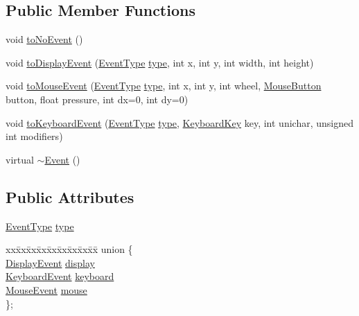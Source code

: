 \subsection*{Public Member Functions}
\begin{DoxyCompactItemize}
\item 
void \hyperlink{classZeta_1_1Event_acda69faf8654653da900fcb8a6d206c8}{to\+No\+Event} ()
\item 
void \hyperlink{classZeta_1_1Event_a956388e8c0923b21f20d8bb5197a16ca}{to\+Display\+Event} (\hyperlink{namespaceZeta_a2417d0aa7e77bdc1e5a79bbb909680ec}{Event\+Type} \hyperlink{classZeta_1_1Event_a6a2e98809068443e94dcf60f45cd45be}{type}, int x, int y, int width, int height)
\item 
void \hyperlink{classZeta_1_1Event_ac22bcd99528bd8995eb4dea400f81a51}{to\+Mouse\+Event} (\hyperlink{namespaceZeta_a2417d0aa7e77bdc1e5a79bbb909680ec}{Event\+Type} \hyperlink{classZeta_1_1Event_a6a2e98809068443e94dcf60f45cd45be}{type}, int x, int y, int wheel, \hyperlink{namespaceZeta_ad0d73128c6ba1daad12e3e286d63c7d3}{Mouse\+Button} button, float pressure, int dx=0, int dy=0)
\item 
void \hyperlink{classZeta_1_1Event_a42aa75c0af72e8bc41aa2e1daf47835b}{to\+Keyboard\+Event} (\hyperlink{namespaceZeta_a2417d0aa7e77bdc1e5a79bbb909680ec}{Event\+Type} \hyperlink{classZeta_1_1Event_a6a2e98809068443e94dcf60f45cd45be}{type}, \hyperlink{namespaceZeta_ad9d19d996b624b55871338b8ca7e629e}{Keyboard\+Key} key, int unichar, unsigned int modifiers)
\item 
virtual \hyperlink{classZeta_1_1Event_af2bd6a6a26b5bdbdc54265d898702b7f}{$\sim$\+Event} ()
\end{DoxyCompactItemize}
\subsection*{Public Attributes}
\begin{DoxyCompactItemize}
\item 
\hyperlink{namespaceZeta_a2417d0aa7e77bdc1e5a79bbb909680ec}{Event\+Type} \hyperlink{classZeta_1_1Event_a6a2e98809068443e94dcf60f45cd45be}{type}
\item 
\begin{tabbing}
xx\=xx\=xx\=xx\=xx\=xx\=xx\=xx\=xx\=\kill
union \{\\
\>\hyperlink{structZeta_1_1Event_1_1DisplayEvent}{DisplayEvent} \hyperlink{classZeta_1_1Event_a9985c0e4f8a18ef859f658dec0dff04d}{display}\\
\>\hyperlink{structZeta_1_1Event_1_1KeyboardEvent}{KeyboardEvent} \hyperlink{classZeta_1_1Event_ae834d422c824e40cb7e50f02653a333f}{keyboard}\\
\>\hyperlink{structZeta_1_1Event_1_1MouseEvent}{MouseEvent} \hyperlink{classZeta_1_1Event_a8e6641071b0b13020a31bb388af1ce2d}{mouse}\\
\}; \\

\end{tabbing}\end{DoxyCompactItemize}


